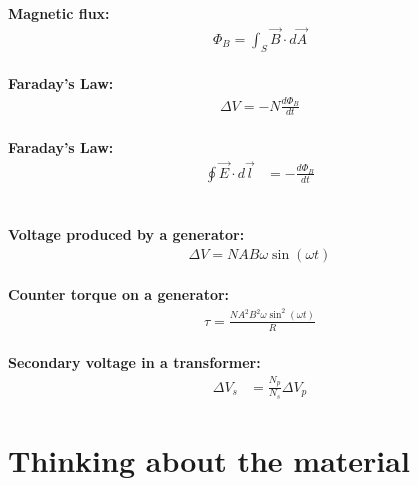 \begin{importantEquations}
\begin{multicols}{2}
\textbf{Magnetic flux:}
\begin{align*}
\Phi_B = \int_S \vec B\cdot d\vec A
\end{align*}
\\
\textbf{Faraday's Law:}
\begin{align*}
\Delta V = -N\frac{d\Phi_B}{dt}
\end{align*}
\\
\textbf{Faraday's Law:}
\begin{align*}
\oint \vec E\cdot d\vec l &= -\frac{d\Phi_B}{dt}
\end{align*}
\\
\columnbreak
\\
\textbf{Voltage produced by a generator:}
\begin{align*}
\Delta V = NAB\omega\sin(\omega t)
\end{align*}
\\
\textbf{Counter torque on a generator:}
\begin{align*}
\tau = \frac{NA^2B^2\omega\sin^2(\omega t)}{R}
\end{align*}
\\
\textbf{Secondary voltage in a transformer:}
\begin{align*}
\Delta V_s &= \frac{N_p}{N_s}\Delta V_p
\end{align*}
\end{multicols}
\end{importantEquations}

\newpage
\section{Thinking about the material}

